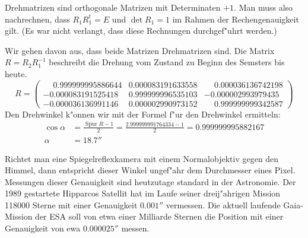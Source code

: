 \begin{loesung}
\begin{teilaufgaben}
\item
Drehmatrizen sind orthogonale Matrizen mit Determinaten $+1$.
Man muss also nachrechnen, dass $R_1R_1^t=E$ und $\det R_1=1$
im Rahmen der Rechengenauigkeit gilt. (Es war nicht verlangt,
dass diese Rechnungen durchgef"uhrt werden.)
\item
Wir gehen davon aus, dass beide Matrizen Drehmatrizen sind.
Die Matrix $R=R_2R_1^{-1}$ beschreibt die Drehung vom Zustand zu Beginn
des Semsters bis heute.
\[
R = \begin{pmatrix}
\phantom{-}0.999999995886644& 0.000083191633558&\phantom{-}0.000036136742198\\
          -0.000083191525418& 0.999999996535103&          -0.000002993979435\\
          -0.000036136991146& 0.000002990973152&\phantom{-}0.999999999342587
\end{pmatrix}
\]
Den Drehwinkel k"onnen wir mit der Formel f"ur den Drehwinkel ermitteln:
\begin{align*}
\cos\alpha
&=
\frac{\operatorname{Spur}R-1}2=\frac{2.999999991764334-1}2
=
0.999999995882167
\\
\alpha&=18.7''
\end{align*}
\end{teilaufgaben}
\end{loesung}

\begin{diskussion}
Richtet man eine Spiegelreflexkamera mit einem Normalobjektiv gegen den
Himmel, dann entspricht dieser Winkel ungef"ahr dem Durchmesser eines Pixel.
Messungen dieser Genauigkeit sind heutzutage standard in der Astronomie.
Der 1989 gestartete Hipparcos Satellit hat im Laufe seiner dreij"ahrigen
Mission 118000 Sterne mit einer Genauigkeit $0.001''$ vermessen.
Die aktuell laufende Gaia-Mission der ESA soll von etwa einer Milliarde
Sternen die Position mit einer Genauigkeit von ewa $0.000025''$ messen.
\end{diskussion}



